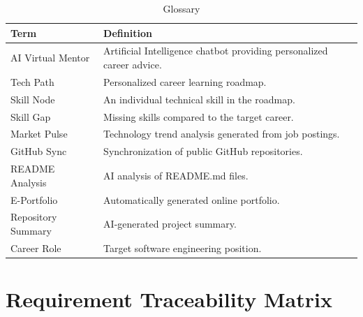 \begin{table}[H]
\centering
\caption{Glossary}
\begin{tabular}{|l|p{10cm}|}
\hline

\textbf{Term} &
\textbf{Definition}
\\ \hline

AI Virtual Mentor &
Artificial Intelligence chatbot providing personalized career advice.
\\ \hline

Tech Path &
Personalized career learning roadmap.
\\ \hline

Skill Node &
An individual technical skill in the roadmap.
\\ \hline

Skill Gap &
Missing skills compared to the target career.
\\ \hline

Market Pulse &
Technology trend analysis generated from job postings.
\\ \hline

GitHub Sync &
Synchronization of public GitHub repositories.
\\ \hline

README Analysis &
AI analysis of README.md files.
\\ \hline

E-Portfolio &
Automatically generated online portfolio.
\\ \hline

Repository Summary &
AI-generated project summary.
\\ \hline

Career Role &
Target software engineering position.
\\ \hline

\end{tabular}
\end{table}


\section{Requirement Traceability Matrix}

